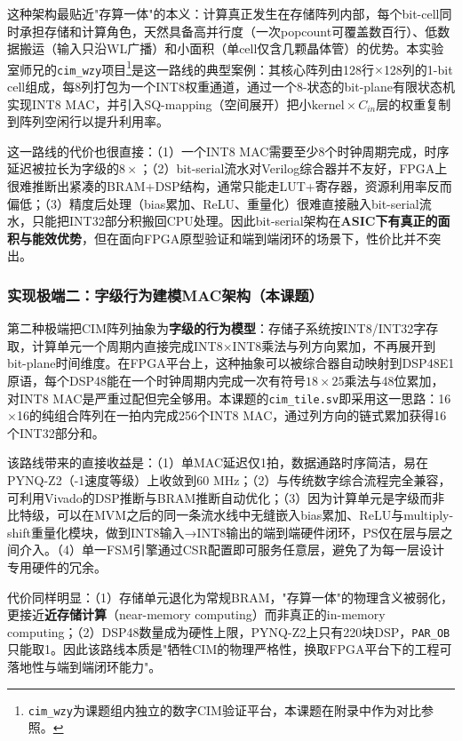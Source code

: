 \documentclass[12pt, a4paper]{article}
\begin{document}
这种架构最贴近"存算一体"的本义：计算真正发生在存储阵列内部，每个bit-cell同时承担存储和计算角色，天然具备高并行度（一次popcount可覆盖数百行）、低数据搬运（输入只沿WL广播）和小面积（单cell仅含几颗晶体管）的优势。本实验室师兄的\texttt{cim\_wzy}项目\footnote{\texttt{cim\_wzy}为课题组内独立的数字CIM验证平台，本课题在附录中作为对比参照。}是这一路线的典型案例：其核心阵列由128行$\times$128列的1-bit cell组成，每8列打包为一个INT8权重通道，通过一个8-状态的bit-plane有限状态机实现INT8 MAC，并引入SQ-mapping（空间展开）把小$\text{kernel}\times C_{in}$层的权重复制到阵列空闲行以提升利用率。

这一路线的代价也很直接：（1）一个INT8 MAC需要至少8个时钟周期完成，时序延迟被拉长为字级的$8\times$；（2）bit-serial流水对Verilog综合器并不友好，FPGA上很难推断出紧凑的BRAM+DSP结构，通常只能走LUT+寄存器，资源利用率反而偏低；（3）精度后处理（bias累加、ReLU、重量化）很难直接融入bit-serial流水，只能把INT32部分积搬回CPU处理。因此bit-serial架构在\textbf{ASIC下有真正的面积与能效优势}，但在面向FPGA原型验证和端到端闭环的场景下，性价比并不突出。

\subsubsection{实现极端二：字级行为建模MAC架构（本课题）}

第二种极端把CIM阵列抽象为\textbf{字级的行为模型}：存储子系统按INT8/INT32字存取，计算单元一个周期内直接完成INT8$\times$INT8乘法与列方向累加，不再展开到bit-plane时间维度。在FPGA平台上，这种抽象可以被综合器自动映射到DSP48E1原语，每个DSP48能在一个时钟周期内完成一次有符号$18\times25$乘法与48位累加，对INT8 MAC是严重过配但完全够用。本课题的\texttt{cim\_tile.sv}即采用这一思路：16$\times$16的纯组合阵列在一拍内完成256个INT8 MAC，通过列方向的链式累加获得16个INT32部分和。

该路线带来的直接收益是：（1）单MAC延迟仅1拍，数据通路时序简洁，易在PYNQ-Z2（-1速度等级）上收敛到60 MHz；（2）与传统数字综合流程完全兼容，可利用Vivado的DSP推断与BRAM推断自动优化；（3）因为计算单元是字级而非比特级，可以在MVM之后的同一条流水线中无缝嵌入bias累加、ReLU与multiply-shift重量化模块，做到INT8输入→INT8输出的端到端硬件闭环，PS仅在层与层之间介入。（4）单一FSM引擎通过CSR配置即可服务任意层，避免了为每一层设计专用硬件的冗余。

代价同样明显：（1）存储单元退化为常规BRAM，"存算一体"的物理含义被弱化，更接近\textbf{近存储计算}（near-memory computing）而非真正的in-memory computing；（2）DSP48数量成为硬性上限，PYNQ-Z2上只有220块DSP，\texttt{PAR\_OB}只能取1。因此该路线本质是"牺牲CIM的物理严格性，换取FPGA平台下的工程可落地性与端到端闭环能力"。
\end{document}
